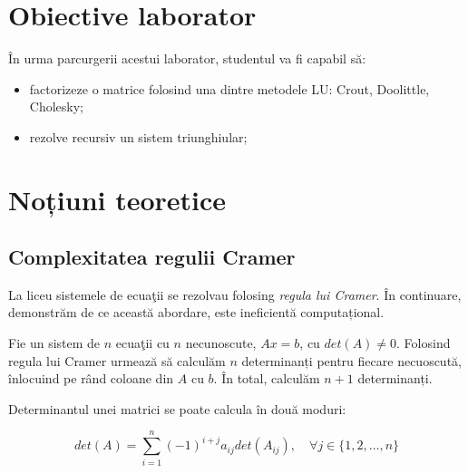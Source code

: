 \documentclass{exam}
\title{
\textmd{\textbf{\MNLabTitle}}
\author{}
\date{}
}
\begin{document}
\begin{coverpages}

	\maketitle
	\thispagestyle{empty}
	\tableofcontents

\end{coverpages}

\section{Obiective laborator}

\par În urma parcurgerii acestui laborator, studentul va fi capabil să:
\begin{itemize}
	\item factorizeze o matrice folosind una dintre metodele LU: Crout,
	      Doolittle, Cholesky;
	\item rezolve recursiv un sistem triunghiular;
\end{itemize}

\section{Noțiuni teoretice}

\subsection{Complexitatea regulii Cramer}

\par La liceu sistemele de ecuaţii se rezolvau folosing
\textit{regula lui Cramer}. În continuare, demonstrăm de ce această abordare,
este ineficientă computațional.

\par Fie un sistem de $n$ ecuaţii cu $n$ necunoscute, $Ax = b$, cu $det(A) \neq 0$.
Folosind regula lui Cramer urmează să calculăm $n$ determinanți pentru fiecare
necuoscută, înlocuind pe rând coloane din $A$ cu $b$. În total, calculăm
$n + 1$ determinanți.

\par Determinantul unei matrici se poate calcula în două moduri:

\begin{equation}
	det(A) = \sum_{i = 1}^{n}{(-1)^{i + j} a_{ij} det(A_{ij})}, \quad \forall j \in \{1, 2, \ldots, n\}
\end{equation}
\end{document}
